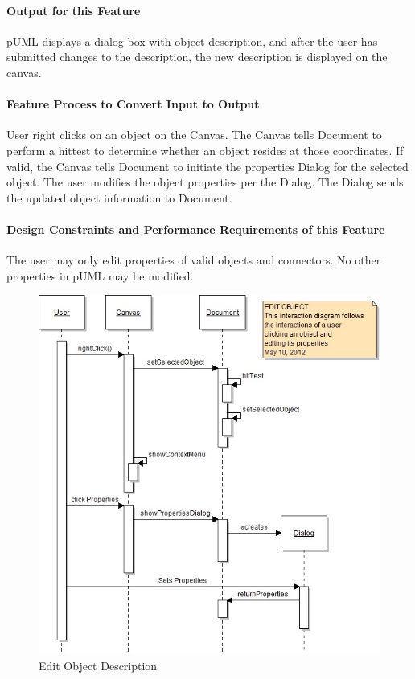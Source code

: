 \documentclass[twoside,letterpaper]{article}
\begin{document}
{\paragraph{Output for this Feature}
{
pUML displays a dialog box with object description, and after the user has submitted changes to the description, the new description is displayed on the canvas. 
}

\paragraph{Feature Process to Convert Input to Output}
{
User right clicks on an object on the Canvas. The Canvas tells Document to perform a hittest to determine whether an object resides at those coordinates. If valid, the Canvas tells Document to initiate the properties Dialog for the selected object. \newline 
The user modifies the object properties per the Dialog.  The Dialog sends the updated object information to Document.
}

\paragraph{Design Constraints and Performance Requirements of this Feature}
{
The user may only edit properties of valid objects and connectors. No other properties in pUML may be modified.
}
\bigskip
\bigskip

\begin{figure}[h]
\centering
\includegraphics[width=6.0in]{IntEditObj.jpg}
\caption{Edit Object Description}
\end{figure}

}
\end{document}
